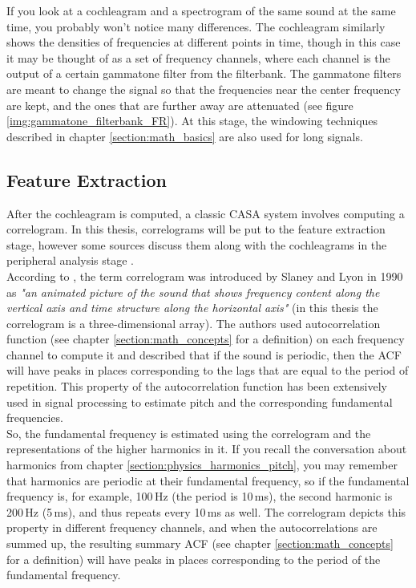 If you look at a cochleagram and a spectrogram of the same sound at the same time, you probably won't notice many differences. The cochleagram similarly shows the densities of frequencies at different points in time, though in this case it may be thought of as a set of frequency channels, where each channel is the output of a certain gammatone filter from the filterbank. The gammatone filters are meant to change the signal so that the frequencies near the center frequency are kept, and the ones that are further away are attenuated (see figure \ref{img:gammatone_filterbank_FR}). At this stage, the windowing techniques described in chapter \ref{section:math_basics} are also used for long signals.


\subsection{Feature Extraction}\label{subsection:casa_feature_extraction}

After the cochleagram is computed, a classic CASA system involves computing a correlogram. In this thesis, correlograms will be put to the feature extraction stage, however some sources discuss them along with the cochleagrams in the peripheral analysis stage \cite{Jasti2020}.\\

According to \cite{Wang2006}, the term correlogram was introduced by Slaney and Lyon in 1990 \cite{Slaney1990} as \textit{"an animated picture of the sound that shows
	frequency content along the vertical axis and time structure along
	the horizontal axis"} (in this thesis the correlogram is a three-dimensional array). The authors used autocorrelation function (see chapter \ref{section:math_concepts} for a definition) on each frequency channel to compute it and described that if the sound is periodic, then the ACF will have peaks in places corresponding to the lags that are equal to the period of repetition. This property of the autocorrelation function has been extensively used in signal processing to estimate pitch and the corresponding fundamental frequencies.\\

So, the fundamental frequency is estimated using the correlogram and the representations of the higher harmonics in it. If you recall the conversation about harmonics from chapter \ref{section:physics_harmonics_pitch}, you may remember that harmonics are periodic at their fundamental frequency, so if the fundamental frequency is, for example, 100\,Hz (the period is 10\,ms), the second harmonic is 200\,Hz (5\,ms), and thus repeats every 10\,ms as well. The correlogram depicts this property in different frequency channels, and when the autocorrelations are summed up, the resulting summary ACF (see chapter \ref{section:math_concepts} for a definition) will have peaks in places corresponding to the period of the fundamental frequency.\\

